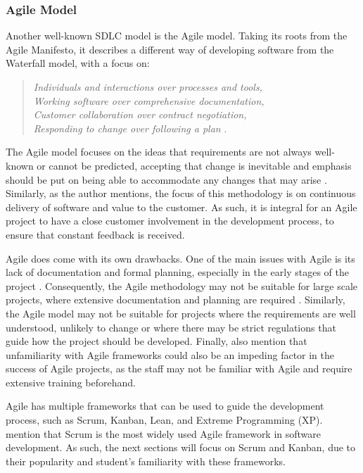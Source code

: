 \subsubsection{Agile Model}

Another well-known SDLC model is the Agile model. Taking its roots from the Agile Manifesto, it describes a different way of developing software from the Waterfall model, with a focus on:

\begin{quote}
    \textit{Individuals and interactions over processes and tools, \\
    Working software over comprehensive documentation, \\
    Customer collaboration over contract negotiation, \\
    Responding to change over following a plan}
    \parencite{agile2}.
\end{quote}

The Agile model focuses on the ideas that requirements are not always well-known or cannot be predicted, accepting that change is inevitable and emphasis should be put on being able to accommodate any changes that may arise \parencite{agile}. Similarly, as the author mentions, the focus of this methodology is on continuous delivery of software and value to the customer. As such, it is integral for an Agile project to have a close customer involvement in the development process, to ensure that constant feedback is received.

Agile does come with its own drawbacks. One of the main issues with Agile is its lack of documentation and formal planning, especially in the early stages of the project \parencite{sdlc1}. Consequently, the Agile methodology may not be suitable for large scale projects, where extensive documentation and planning are required \parencite{agile, sdlc2}. Similarly, the Agile model may not be suitable for projects where the requirements are well understood, unlikely to change or where there may be strict regulations that guide how the project should be developed. Finally, \textcite{sdlc2} also mention that unfamiliarity with Agile frameworks could also be an impeding factor in the success of Agile projects, as the staff may not be familiar with Agile and require extensive training beforehand.

Agile has multiple frameworks that can be used to guide the development process, such as Scrum, Kanban, Lean, and Extreme Programming (XP).\ \textcite{scrumban} mention that Scrum is the most widely used Agile framework in software development. As such, the next sections will focus on Scrum and Kanban, due to their popularity and student's familiarity with these frameworks.

